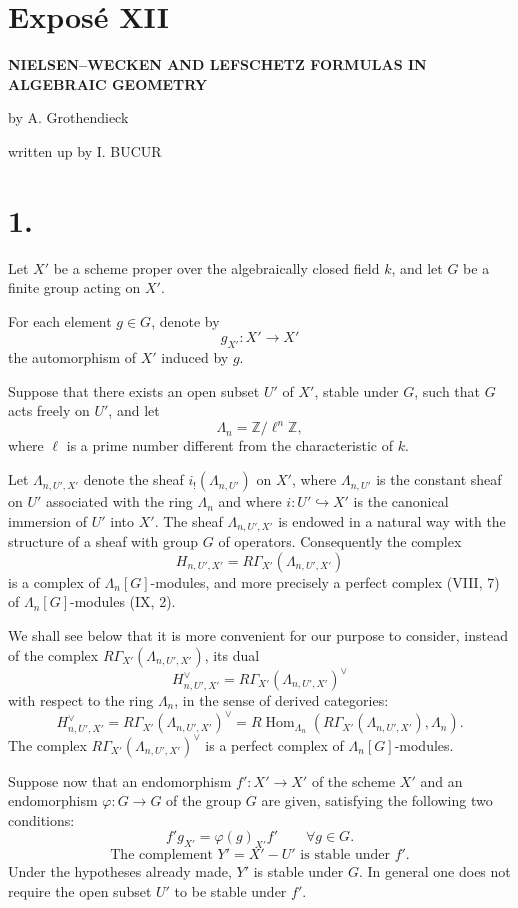 \documentclass[11pt]{article}
\DeclareMathOperator{\Hom}{Hom}
\providecommand{\Hom}{\operatorname{Hom}}
\providecommand{\La}{\Lambda}
\providecommand{\bZ}{\mathbb Z}
\providecommand{\Hom}{\operatorname{Hom}}
\begin{document}
\section*{Exposé XII}

\begin{center}
\Large\bfseries NIELSEN--WECKEN AND LEFSCHETZ FORMULAS IN ALGEBRAIC GEOMETRY
\end{center}

\begin{center}
by A. Grothendieck

written up by I. BUCUR
\end{center}

\bigskip

\section*{1.}
Let $X'$ be a scheme proper over the algebraically closed field $k$, and let $G$ be a finite group acting on $X'$.

For each element $g\in G$, denote by
\[
g_{X'}:X'\to X'
\]
the automorphism of $X'$ induced by $g$.

Suppose that there exists an open subset $U'$ of $X'$, stable under $G$, such that $G$ acts freely on $U'$, and let
\[
\La_n=\bZ/\ell^n\bZ,
\]
where $\ell$ is a prime number different from the characteristic of $k$.

Let $\La_{n,U',X'}$ denote the sheaf $i_!(\La_{n,U'})$ on $X'$, where $\La_{n,U'}$ is the constant sheaf on $U'$ associated with the ring $\La_n$ and where $i:U'\hookrightarrow X'$ is the canonical immersion of $U'$ into $X'$. The sheaf $\La_{n,U',X'}$ is endowed in a natural way with the structure of a sheaf with group $G$ of operators. Consequently the complex
\[
H_{n,U',X'}=R\Gamma_{X'}(\La_{n,U',X'})
\]
is a complex of $\La_n[G]$-modules, and more precisely a perfect complex (VIII, 7) of $\La_n[G]$-modules (IX, 2).

We shall see below that it is more convenient for our purpose to consider, instead of the complex $R\Gamma_{X'}(\La_{n,U',X'})$, its dual
\[
H_{n,U',X'}^\vee=R\Gamma_{X'}(\La_{n,U',X'})^\vee
\]
with respect to the ring $\La_n$, in the sense of derived categories:
\[
H_{n,U',X'}^\vee
=R\Gamma_{X'}(\La_{n,U',X'})^\vee
=R\Hom_{\La_n}(R\Gamma_{X'}(\La_{n,U',X'}),\La_n).
\]
The complex $R\Gamma_{X'}(\La_{n,U',X'})^\vee$ is a perfect complex of $\La_n[G]$-modules.

Suppose now that an endomorphism $f':X'\to X'$ of the scheme $X'$ and an endomorphism $\varphi:G\to G$ of the group $G$ are given, satisfying the following two conditions:
\begin{equation}\tag{1.1}
f'g_{X'}=\varphi(g)_{X'}f'\qquad \forall g\in G .
\end{equation}
\begin{equation}\tag{1.2}
\text{The complement }Y'=X'-U'\text{ is stable under }f'.
\end{equation}
Under the hypotheses already made, $Y'$ is stable under $G$. In general one does not require the open subset $U'$ to be stable under $f'$.
\end{document}
